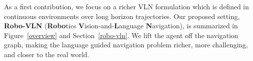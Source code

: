\documentclass[letter, 10pt, conference]{ieeeconf}
\begin{document}
\begin{table*}[t!]
\scriptsize
\centering
\vspace{+0.15cm}
\caption{\textbf{Comparison between our proposed Robo-VLN setting and prior environments used for Vision-and-Language Navigation}} \label{tab:a}
\label{rvln_comparison}
\end{table*}
\begin{comment}
transform an existing VLN dataset to a new VLN formulation defined in continuous environments over long horizon trajectories
\end{comment}
As a first contribution, we focus on a richer VLN formulation which is defined in continuous environments over long horizon trajectories. Our proposed setting, \textbf{Robo-VLN} (\textbf{Robo}tics \textbf{V}ision-and-\textbf{L}anguage \textbf{N}avigation), is summarized in Figure~\ref{overview} and Section~\ref{robo-vln}. We lift the agent off the navigation graph, making the language guided navigation problem richer, more challenging, and closer to the real world. 
\begin{comment}
Consider an example instruction as shown in Figure \ref{overview}: \enquote{Move forward through the corridor and turn right into the bedroom. Wait by the window on the right}. 
When following this sequence of instructions, the robot has to learn to identify key objects in the scene (\textit Perception), keep track of which instructions are completed (\textit Memory), match instructions to spatial information in the environment (\textit Cognition/Reasoning) and act on the high-level decisions to generate low-level control commands for navigation in  space (\textit Controls).
\end{comment}
\end{document}
